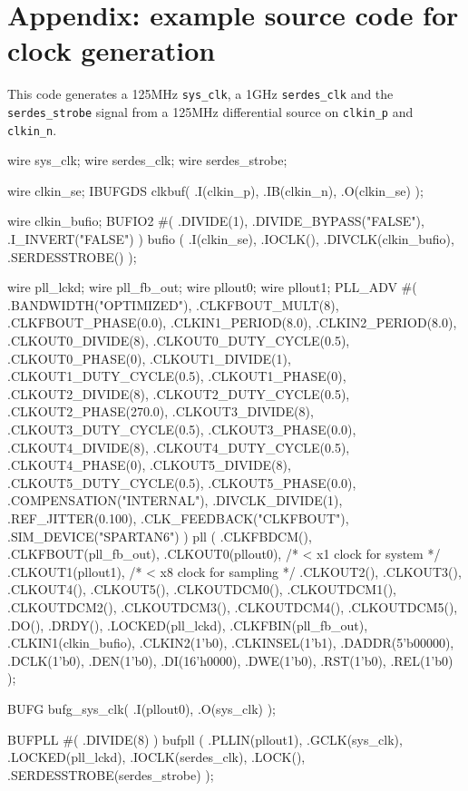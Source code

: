 \documentclass[a4paper,11pt]{article}
\begin{document}
\pagebreak

\section*{Appendix: example source code for clock generation}
This code generates a 125MHz \verb!sys_clk!, a 1GHz \verb!serdes_clk! and the \verb!serdes_strobe! signal from a 125MHz differential source on \verb!clkin_p! and \verb!clkin_n!.

\begin{verbatimtab}
wire sys_clk;
wire serdes_clk;
wire serdes_strobe;

wire clkin_se;
IBUFGDS clkbuf(
	.I(clkin_p),
	.IB(clkin_n),
	.O(clkin_se)
);

wire clkin_bufio;
BUFIO2 #(
	.DIVIDE(1),
	.DIVIDE_BYPASS("FALSE"),
	.I_INVERT("FALSE")
) bufio (
	.I(clkin_se),
	.IOCLK(),
	.DIVCLK(clkin_bufio),
	.SERDESSTROBE()
);

wire pll_lckd;
wire pll_fb_out;
wire pllout0;
wire pllout1;
PLL_ADV #(
	.BANDWIDTH("OPTIMIZED"),
	.CLKFBOUT_MULT(8),
	.CLKFBOUT_PHASE(0.0),
	.CLKIN1_PERIOD(8.0),
	.CLKIN2_PERIOD(8.0),
	.CLKOUT0_DIVIDE(8),
	.CLKOUT0_DUTY_CYCLE(0.5),
	.CLKOUT0_PHASE(0),
	.CLKOUT1_DIVIDE(1),
	.CLKOUT1_DUTY_CYCLE(0.5),
	.CLKOUT1_PHASE(0),
	.CLKOUT2_DIVIDE(8),
	.CLKOUT2_DUTY_CYCLE(0.5),
	.CLKOUT2_PHASE(270.0),
	.CLKOUT3_DIVIDE(8),
	.CLKOUT3_DUTY_CYCLE(0.5),
	.CLKOUT3_PHASE(0.0),
	.CLKOUT4_DIVIDE(8),
	.CLKOUT4_DUTY_CYCLE(0.5),
	.CLKOUT4_PHASE(0),
	.CLKOUT5_DIVIDE(8),
	.CLKOUT5_DUTY_CYCLE(0.5),
	.CLKOUT5_PHASE(0.0),
	.COMPENSATION("INTERNAL"),
	.DIVCLK_DIVIDE(1),
	.REF_JITTER(0.100),
	.CLK_FEEDBACK("CLKFBOUT"),
	.SIM_DEVICE("SPARTAN6")
) pll (
	.CLKFBDCM(),
	.CLKFBOUT(pll_fb_out),
	.CLKOUT0(pllout0), /* < x1 clock for system */
	.CLKOUT1(pllout1), /* < x8 clock for sampling */
	.CLKOUT2(),
	.CLKOUT3(),
	.CLKOUT4(),
	.CLKOUT5(),
	.CLKOUTDCM0(),
	.CLKOUTDCM1(),
	.CLKOUTDCM2(),
	.CLKOUTDCM3(),
	.CLKOUTDCM4(),
	.CLKOUTDCM5(),
	.DO(),
	.DRDY(),
	.LOCKED(pll_lckd),
	.CLKFBIN(pll_fb_out),
	.CLKIN1(clkin_bufio),
	.CLKIN2(1'b0),
	.CLKINSEL(1'b1),
	.DADDR(5'b00000),
	.DCLK(1'b0),
	.DEN(1'b0),
	.DI(16'h0000),
	.DWE(1'b0),
	.RST(1'b0),
	.REL(1'b0)
);

BUFG bufg_sys_clk(
	.I(pllout0),
	.O(sys_clk)
);

BUFPLL #(
	.DIVIDE(8)
) bufpll (
	.PLLIN(pllout1),
	.GCLK(sys_clk),
	.LOCKED(pll_lckd),
	.IOCLK(serdes_clk),
	.LOCK(),
	.SERDESSTROBE(serdes_strobe)
);
\end{verbatimtab}
\end{document}
